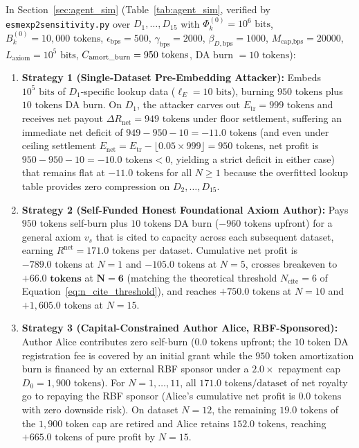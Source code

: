 \documentclass[runningheads,a4paper]{llncs}
\renewcommand{\_}{\textunderscore\allowbreak}
\begin{document}
In Section~\ref{sec:agent_sim} (Table~\ref{tab:agent_sim}, verified by \texttt{esm\_exp2\_sensitivity.py} over $D_1,\allowbreak \dots,\allowbreak D_{15}$ with $\Phi_k^{(0)} = 10^6\text{ bits}$, $B_k^{(0)} = 10,000\text{ tokens}$, $\epsilon_{\text{bps}} = 500$, $\gamma_{\text{bps}} = 2000$, $\beta_{D,\text{bps}} = 1000$, $M_{\text{cap,bps}} = 20000$, $L_{\text{axiom}} = 10^5\text{ bits}$, $C_{\text{amort\_burn}} = 950\text{ tokens}$, DA burn $= 10\text{ tokens}$):
\begin{enumerate}
  \item \textbf{Strategy 1 (Single-Dataset Pre-Embedding Attacker):} Embeds $10^5\text{ bits}$ of $D_1$-specific lookup data ($\ell_E = 10\text{ bits}$), burning $950\text{ tokens}$ plus $10\text{ tokens}$ DA burn. On $D_1$, the attacker carves out $E_{\text{tr}} = 999\text{ tokens}$ and receives net payout $\Delta R_{\text{net}} = 949\text{ tokens}$ under floor settlement, suffering an immediate net deficit of $949 - 950 - 10 = -11.0\text{ tokens}$ (and even under ceiling settlement $E_{\text{net}} = E_{\text{tr}} - \lfloor 0.05 \times 999 \rfloor = 950\text{ tokens}$, net profit is $950 - 950 - 10 = -10.0\text{ tokens} < 0$, yielding a strict deficit in either case) that remains flat at $-11.0\text{ tokens}$ for all $N \ge 1$ because the overfitted lookup table provides zero compression on $D_2,\allowbreak \dots,\allowbreak D_{15}$.
  \item \textbf{Strategy 2 (Self-Funded Honest Foundational Axiom Author):} Pays $950\text{ tokens}$ self-burn plus $10\text{ tokens}$ DA burn ($-960\text{ tokens}$ upfront) for a general axiom $v_s$ that is cited to capacity across each subsequent dataset, earning $R^{\text{net}} = 171.0\text{ tokens}$ per dataset. Cumulative net profit is $-789.0\text{ tokens}$ at $N=1$ and $-105.0\text{ tokens}$ at $N=5$, crosses breakeven to $\mathbf{+66.0\text{ tokens}}$ at $\mathbf{N = 6}$ (matching the theoretical threshold $N_{\text{cite}} = 6$ of Equation~\eqref{eq:n_cite_threshold}), and reaches $+750.0\text{ tokens}$ at $N=10$ and $+1,605.0\text{ tokens}$ at $N=15$.
  \item \textbf{Strategy 3 (Capital-Constrained Author Alice, RBF-Sponsored):} Author Alice contributes zero self-burn ($0.0\text{ tokens}$ upfront; the $10\text{ token}$ DA registration fee is covered by an initial grant while the $950\text{ token}$ amortization burn is financed by an external RBF sponsor under a $2.0\times$ repayment cap $D_0 = 1,900\text{ tokens}$). For $N = 1,\allowbreak \dots,\allowbreak 11$, all $171.0\text{ tokens/dataset}$ of net royalty go to repaying the RBF sponsor (Alice's cumulative net profit is $0.0\text{ tokens}$ with zero downside risk). On dataset $N = 12$, the remaining $19.0\text{ tokens}$ of the $1,900\text{ token}$ cap are retired and Alice retains $152.0\text{ tokens}$, reaching $+665.0\text{ tokens}$ of pure profit by $N = 15$.

\end{enumerate}
\end{document}
